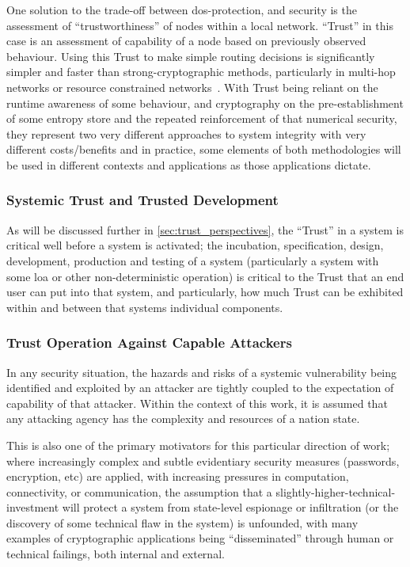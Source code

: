 One solution to the trade-off between \gls{dos}-protection, and security is the assessment of ``trustworthiness'' of nodes within a local network. 
``Trust'' in this case is an assessment of capability of a node based on previously observed behaviour. 
Using this Trust to make simple routing decisions is significantly simpler and faster than strong-cryptographic methods, particularly in multi-hop networks or resource constrained networks~\cite{Cordasco2008}.
With Trust being reliant on the runtime awareness of some behaviour, and cryptography on the pre-establishment of some entropy store and the repeated reinforcement of that numerical security, they represent two very different approaches to system integrity with very different costs/benefits and in practice, some elements of both methodologies will be used in different contexts and applications as those applications dictate.

\subsubsection{Systemic Trust and Trusted Development}
As will be discussed further in \autoref{sec:trust_perspectives}, the ``Trust'' in a system is critical well before a system is activated; the incubation, specification, design, development, production and testing of a system (particularly a system with some \gls{loa} or other non-deterministic operation) is critical to the Trust that an end user can put into that system, and particularly, how much Trust can be exhibited within and between that systems individual components.


\subsubsection{Trust Operation Against Capable Attackers}\label{sec:capable_attackers}

In any security situation, the hazards and risks of a systemic vulnerability being identified and exploited by an attacker are tightly coupled to the expectation of capability of that attacker.
Within the context of this work, it is assumed that any attacking agency has the complexity and resources of a nation state.

This is also one of the primary motivators for this particular direction of work; where increasingly complex and subtle evidentiary security measures (passwords, encryption, etc) are applied, with increasing pressures in computation, connectivity, or communication, the assumption that a slightly-higher-technical-investment will protect a system from state-level espionage or infiltration (or the discovery of some technical flaw in the system) is unfounded, with many examples of cryptographic applications being ``disseminated'' through human or technical failings, both internal and external. 


